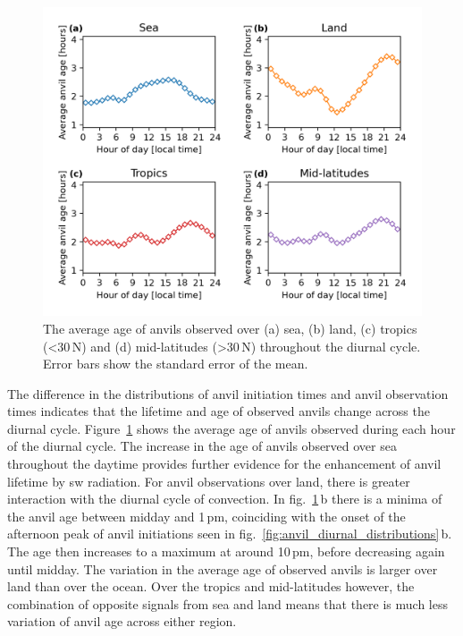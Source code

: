 \begin{figure}[tp]
    \centering
    \includegraphics[width=\textwidth]{figures/chapter2_27.png}
    \caption[
    The average age of anvils observed over sea, land, tropics and mid-latitudes throughout the diurnal cycle.
    ]{
    The average age of anvils observed over (a) sea, (b) land, (c) tropics (\textless 30\,\textdegree N) and (d) mid-latitudes (\textgreater 30\,\textdegree N) throughout the diurnal cycle. Error bars show the standard error of the mean.
    }
    \label{fig:anvil_diurnal_age}
\end{figure}

The difference in the distributions of anvil initiation times and anvil observation times indicates that the lifetime and age of observed anvils change across the diurnal cycle.
Figure~\ref{fig:anvil_diurnal_age} shows the average age of anvils observed during each hour of the diurnal cycle.
The increase in the age of anvils observed over sea throughout the daytime provides further evidence for the enhancement of anvil lifetime by \acrshort{sw} radiation.
For anvil observations over land, there is greater interaction with the diurnal cycle of convection.
In fig.~\ref{fig:anvil_diurnal_age}\,b there is a minima of the anvil age between midday and 1\,pm, coinciding with the onset of the afternoon peak of anvil initiations seen in fig.~\ref{fig:anvil_diurnal_distributions}\,b.
The age then increases to a maximum at around 10\,pm, before decreasing again until midday.
The variation in the average age of observed anvils is larger over land than over the ocean.
Over the tropics and mid-latitudes however, the combination of opposite signals from sea and land means that there is much less variation of anvil age across either region.



